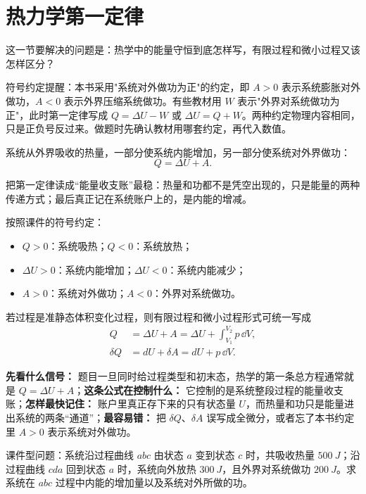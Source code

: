 \documentclass[lang=cn,11pt]{elegantbook}
\newcommand{\bridge}[1]{\begin{note}#1\end{note}}
\begin{document}
\section{热力学第一定律}

这一节要解决的问题是：热学中的能量守恒到底怎样写，有限过程和微小过程又该怎样区分？

\bridge{符号约定提醒：本书采用"系统对外做功为正"的约定，即 \(A>0\) 表示系统膨胀对外做功，\(A<0\) 表示外界压缩系统做功。有些教材用 \(W\) 表示"外界对系统做功为正"，此时第一定律写成 \(Q=\Delta U-W\) 或 \(\Delta U=Q+W\)。两种约定物理内容相同，只是正负号反过来。做题时先确认教材用哪套约定，再代入数值。}

\begin{theorem}[热力学第一定律]\label{thm:first-law}
系统从外界吸收的热量，一部分使系统内能增加，另一部分使系统对外界做功：
\[
Q=\Delta U+A.
\]
\end{theorem}

\bridge{把第一定律读成“能量收支账”最稳：热量和功都不是凭空出现的，只是能量的两种传递方式；最后真正记在系统账户上的，是内能的增减。}

按照课件的符号约定：
\begin{itemize}
  \item \(Q>0\)：系统吸热；\(Q<0\)：系统放热；
  \item \(\Delta U>0\)：系统内能增加；\(\Delta U<0\)：系统内能减少；
  \item \(A>0\)：系统对外做功；\(A<0\)：外界对系统做功。
\end{itemize}

若过程是准静态体积变化过程，则有限过程和微小过程形式可统一写成
\begin{align*}
Q&=\Delta U+A=\Delta U+\int_{V_1}^{V_2}p\,\dd V,\\
\delta Q&=dU+\delta A=dU+p\,\dd V.
\end{align*}

\begin{note}
\textbf{先看什么信号：} 题目一旦同时给过程类型和初末态，热学的第一条总方程通常就是 \(Q=\Delta U+A\)；\textbf{这条公式在控制什么：} 它控制的是系统整段过程的能量收支账；\textbf{怎样最快记住：} 账户里真正存下来的只有状态量 \(U\)，而热量和功只是能量进出系统的两条“通道”；\textbf{最容易错：} 把 \(\delta Q\)、\(\delta A\) 误写成全微分，或者忘了本书约定里 \(A>0\) 表示系统对外做功。
\end{note}

\begin{example}[同一初末态下怎样分清谁与路径有关]
课件型问题：系统沿过程曲线 \(abc\) 由状态 \(a\) 变到状态 \(c\) 时，共吸收热量 \(\SI{500}{J}\)；沿过程曲线 \(cda\) 回到状态 \(a\) 时，系统向外放热 \(\SI{300}{J}\)，且外界对系统做功 \(\SI{200}{J}\)。求系统在 \(abc\) 过程中内能的增加量以及系统对外所做的功。
\end{example}
\end{document}
